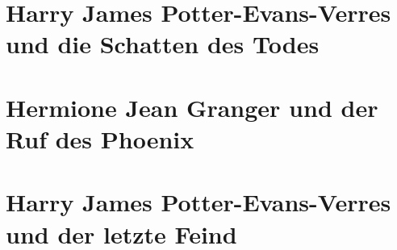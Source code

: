 \part{Harry James Potter-Evans-Verres und die Schatten des Todes}


























\part{Hermione Jean Granger und der Ruf des Phoenix}
\setcounter{chapter}{64}






















\part{Harry James Potter-Evans-Verres und der letzte Feind}















